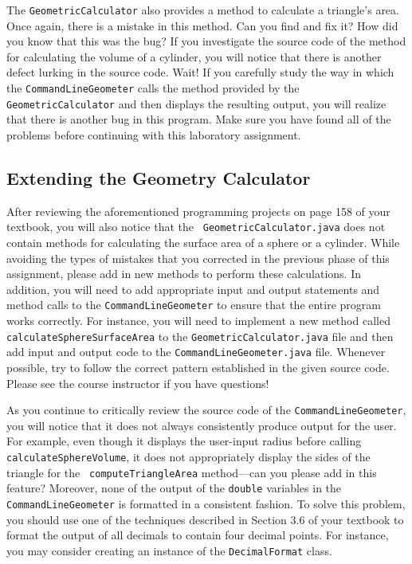 The {\tt GeometricCalculator} also provides a method to calculate a triangle's area.  Once again, there is a
mistake in this method.  Can you find and fix it? How did you know that this was the bug? If you investigate the source
code of the method for calculating the volume of a cylinder, you will notice that there is another defect lurking in the
source code. Wait! If you carefully study the way in which the {\tt CommandLineGeometer} calls the method
provided by the {\tt GeometricCalculator} and then displays the resulting output, you will realize that there is another
bug in this program. Make sure you have found all of the problems before continuing with this laboratory assignment.

\vspace*{-.1in}
\subsection*{Extending the Geometry Calculator}

\begin{sloppypar}
  After reviewing the aforementioned programming projects on page 158 of your textbook, you will also notice that the {\tt
  GeometricCalculator.java} does not contain methods for calculating the surface area of a sphere or a cylinder.  While
  avoiding the types of mistakes that you corrected in the previous phase of this assignment, please add in new methods
  to perform these calculations. In addition, you will need to add appropriate input and output statements and method
  calls to the {\tt CommandLineGeometer} to ensure that the entire program works correctly. For instance, you will need to
  implement a new method called {\tt calculateSphereSurfaceArea} to the {\tt GeometricCalculator.java} file and then add
  input and output code to the {\tt CommandLineGeometer.java} file. Whenever possible, try to follow the correct
  pattern established in the given source code. Please see the course instructor if you have questions!
\end{sloppypar}

As you continue to critically review the source code of the {\tt CommandLineGeometer}, you will notice that it does not
always consistently produce output for the user.  For example, even though it displays the user-input radius before
calling {\tt calculateSphereVolume}, it does not appropriately display the sides of the triangle for the {\tt
computeTriangleArea} method---can you please add in this feature? Moreover, none of the output of the {\tt double}
variables in the {\tt CommandLineGeometer} is formatted in a consistent fashion. To solve this problem, you should use
one of the techniques described in Section 3.6 of your textbook to format the output of all decimals to contain four
decimal points. For instance, you may consider creating an instance of the {\tt DecimalFormat} class.

